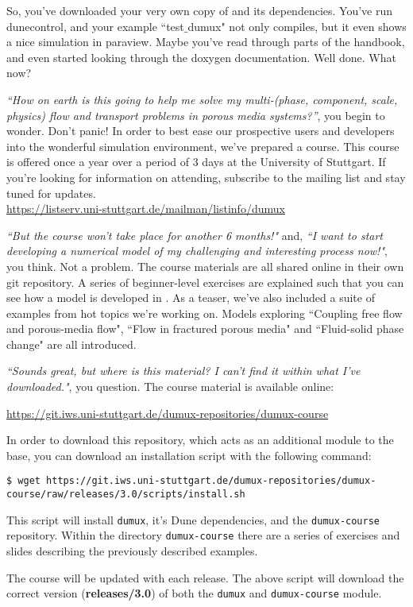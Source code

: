 So, you've downloaded your very own copy of \Dumux and its dependencies.
You've run dunecontrol, and your example ``test$\_$dumux" not only compiles,
but it even shows a nice simulation in paraview. 
Maybe you've read through parts of the handbook, and even started looking 
through the doxygen documentation. 
Well done. What now? \par
%
\textit{``How on earth is this going to help me solve my multi-(phase, component, 
scale, physics) flow and transport problems in porous media systems?''}, you begin to wonder.
Don't panic! In order to best ease our prospective users and developers into the
wonderful \Dumux simulation environment, we've prepared a \Dumux course. 
This course is offered once a year over a period of 3 days at the University of Stuttgart.
If you're looking for information on attending, subscribe to the \Dumux mailing list 
and stay tuned for updates. \\
\url{https://listserv.uni-stuttgart.de/mailman/listinfo/dumux} \par
%
\textit{``But the course won't take place for another 6 months!"} and, 
\textit{``I want to start developing a numerical model of my challenging and 
	interesting process now!"}, you think. 
Not a problem. The course materials are all shared online in their own 
git repository. A series of beginner-level exercises are explained 
such that you can see how a model is developed in \Dumux. As a teaser, we've
 also included a suite of examples from hot topics we're working on. Models
  exploring ``Coupling free flow and porous-media flow", ``Flow in fractured
   porous media" and ``Fluid-solid phase change" are all introduced.  \par
\textit{``Sounds great, but where is this material? I can't find it within
what I've downloaded."}, you question. 
The \Dumux course material is available online: \par
\url{https://git.iws.uni-stuttgart.de/dumux-repositories/dumux-course} \par
In order to download this repository, which acts as an additional module to 
the \Dumux base, you can download an installation script with the following command:
\begin{lstlisting}[style=Bash]
$ wget https://git.iws.uni-stuttgart.de/dumux-repositories/dumux-course/raw/releases/3.0/scripts/install.sh
\end{lstlisting}
This script will install \texttt{dumux}, it's Dune dependencies, and the \texttt{dumux-course} 
repository. Within the directory \texttt{dumux-course} there are a series of exercises 
and slides describing the previously described examples. \par
%
The \Dumux course will be updated with each \Dumux release.
The above script will download the correct version (\textbf{releases/3.0}) of both
the \texttt{dumux} and \texttt{dumux-course} module.

